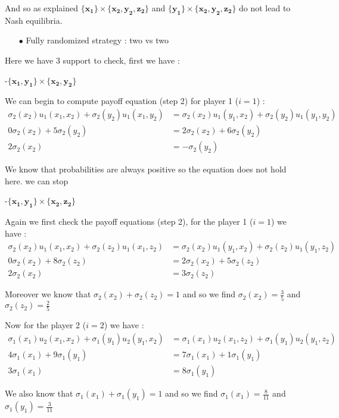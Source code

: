 And so as explained $\mathbf{\{x_1\}}\times\mathbf{\{x_2,y_2,z_2\}}$ and $\mathbf{\{y_1\}}\times\mathbf{\{x_2,y_2,z_2\}}$ do not lead to Nash equilibria.


\begin{itemize}
  \item[$\bullet$] Fully randomized strategy : two vs two
\end{itemize}

Here we have 3 support to check, first we have :

-$\mathbf{\{x_1,y_1\}}\times\mathbf{\{x_2,y_2\}}$

 We can begin to compute payoff equation (step 2) for player 1 ($i=1$) :
 \begin{align*}
 \sigma_2(x_2)u_1(x_1,x_2) + \sigma_2(y_2)u_1(x_1,y_2) &= \sigma_2(x_2)u_1(y_1,x_2) + \sigma_2(y_2)u_1(y_1,y_2) \\
 0\sigma_2(x_2)+5\sigma_2(y_2)&= 2\sigma_2(x_2) + 6\sigma_2(y_2) \\
 2\sigma_2(x_2)&=-\sigma_2(y_2)
\end{align*}

We know that probabilities are always positive so the equation does not hold here. we can stop


-$\mathbf{\{x_1,y_1\}}\times\mathbf{\{x_2,z_2\}}$

Again we first check the payoff equations (step 2), for the player 1 ($i=1$) we have : 
\begin{align*}
 \sigma_2(x_2)u_1(x_1,x_2) + \sigma_2(z_2)u_1(x_1,z_2) &= \sigma_2(x_2)u_1(y_1,x_2) + \sigma_2(z_2)u_1(y_1,z_2) \\
 0\sigma_2(x_2)+8\sigma_2(z_2)&= 2\sigma_2(x_2) + 5\sigma_2(z_2) \\
 2\sigma_2(x_2)&=3\sigma_2(z_2)
\end{align*}

Moreover we know that $\sigma_2(x_2) + \sigma_2(z_2) = 1$ and so we find $\sigma_2(x_2)=\frac{3}{5}$ and $\sigma_2(z_2)=\frac{2}{5}$

Now for the player 2 ($i=2$) we have : 
\begin{align*}
 \sigma_1(x_1)u_2(x_1,x_2) + \sigma_1(y_1)u_2(y_1,x_2) &= \sigma_1(x_1)u_2(x_1,z_2) + \sigma_1(y_1)u_2(y_1,z_2) \\
 4\sigma_1(x_1)+9\sigma_1(y_1)&= 7\sigma_1(x_1) + 1\sigma_1(y_1) \\
 3\sigma_1(x_1)&=8\sigma_1(y_1)
\end{align*}

We also know that $\sigma_1(x_1) + \sigma_1(y_1) = 1$ and so we find $\sigma_1(x_1)=\frac{8}{11}$ and $\sigma_1(y_1)=\frac{3}{11}$

